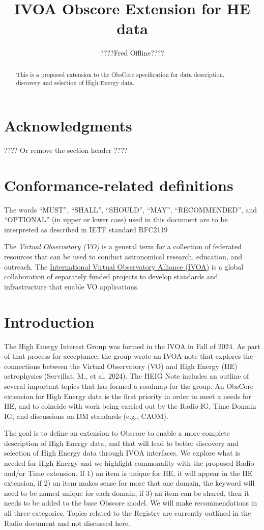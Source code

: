 \documentclass[11pt,a4paper]{ivoa}
\title{IVOA Obscore Extension for HE data}
\author{????Fred Offline????}
\begin{document}
\begin{abstract}
This is a proposed extension to the ObsCore specification for data description, discovery and selection of High Energy data.  
\end{abstract}

\section*{Acknowledgments}

???? Or remove the section header ????

\section*{Conformance-related definitions}

The words ``MUST'', ``SHALL'', ``SHOULD'', ``MAY'', ``RECOMMENDED'', and
``OPTIONAL'' (in upper or lower case) used in this document are to be
interpreted as described in IETF standard RFC2119 \citep{std:RFC2119}.

The \emph{Virtual Observatory (VO)} is a general term for a collection of federated resources that can be used to conduct astronomical research, education, and outreach.
The \href{https://www.ivoa.net}{International Virtual Observatory Alliance (IVOA)} is a global collaboration of separately funded projects to develop standards and infrastructure that enable VO applications.

\section{Introduction}

The High Energy Interest Group was formed in the IVOA in Fall of 2024.  As part of that process for acceptance, the group wrote an \gls{IVOA} note that explores the connections between the Virtual Observatory (\gls{VO}) and High Energy (\gls{HE}) astrophysics (Servillat, M., et al, 2024). The \gls{HEIG} Note includes an outline of several important topics that has formed a roadmap for the group. An ObsCore extension for High Energy data is the first priority in order to meet a needs for \gls{HE}, and to coincide with work being carried out by the Radio IG, Time Domain IG, and discussions on DM standards (e.g., \gls{CAOM}).

The goal is to define an extension to Obscore to enable a more complete description of High Energy data, and that will lead to better discovery and selection of High Energy data through \gls{IVOA} interfaces.  We explore what is needed for High Energy and we highlight commonality with the proposed Radio and/or Time extension.  If 1) an item is unique for \gls{HE}, it will appear in the HE extension, if 2) an item makes sense for more that one domain, the keyword will need to be named unique for each domain, if 3) an item can be shared, then it needs to be added to the base Obscore model.  We will make recommendations in all three categories.   Topics related to the Registry are currently outlined in the Radio document and not discussed here.
\end{document}
